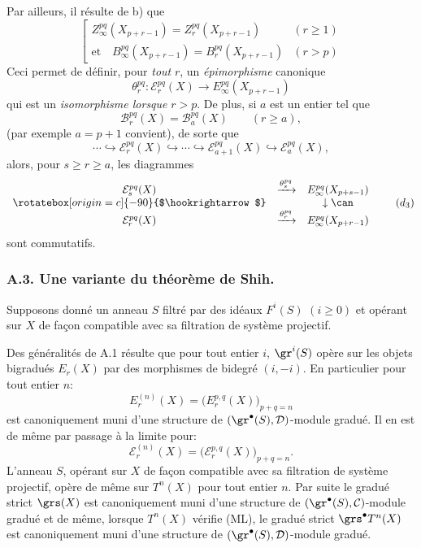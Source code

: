 Par ailleurs, il résulte de b) que
\begin{equation}
\left[
\begin{array}{ll}
Z_\infty^{pq}(X_{p+r-1})=Z_r^{pq}(X_{p+r-1})&(r\ge1)\\[3pt]
\text{et}\quad B_\infty^{pq}(X_{p+r-1})=B_r^{pq}(X_{p+r-1})&(r>p)
\end{array}
\right.
\tag{\(d_2\)}
\end{equation}
Ceci permet de définir, pour \emph{tout} \(r\), un \emph{épimorphisme} canonique
\[
\theta_r^{pq}:\mathcal{E}_r^{pq}(X)\longrightarrow E_\infty^{pq}(X_{p+r-1})
\]
qui est un \emph{isomorphisme lorsque} \(r>p\). De plus, si \(a\) est un entier tel que
\[
\mathcal{B}_r^{pq}(X)=\mathcal{B}_a^{pq}(X)\qquad(r\ge a),
\]
(par exemple \(a=p+1\) convient), de sorte que
\begin{equation}
\cdots\hookrightarrow\mathcal{E}_r^{pq}(X)\hookrightarrow\cdots\hookrightarrow
\mathcal{E}_{a+1}^{pq}(X)\hookrightarrow\mathcal{E}_a^{pq}(X),
\tag{S bis}
\end{equation}
alors, pour \(s\ge r\ge a\), les diagrammes
\begin{equation}
\begin{array}{ccc}
\mathcal{E}_s^{pq}(X)&\xrightarrow{\theta_s^{pq}}&E_\infty^{pq}(X_{p+s-1})\\
\rotatebox[origin=c]{-90}{$\hookrightarrow$}&&\downarrow\can\\
\mathcal{E}_r^{pq}(X)&\xrightarrow{\theta_r^{pq}}&E_\infty^{pq}(X_{p+r-1})
\end{array}
\tag{\(d_3\)}
\end{equation}
sont commutatifs.

\subsubsection*{A.3. Une variante du théorème de Shih.}
Supposons donné un anneau \(S\) filtré par des idéaux \(F^i(S)\) \((i\ge0)\) et opérant sur \(X\) de façon compatible avec sa filtration de système projectif.

Des généralités de A.1 résulte que pour tout entier \(i\), \(\gr^i(S)\) opère sur les objets bigradués \(E_r(X)\) par des morphismes de bidegré \((i,-i)\). En particulier pour tout entier \(n\):
\[
E_r^{(n)}(X)=\bigl(E_r^{p,q}(X)\bigr)_{p+q=n}
\]
est canoniquement muni d'une structure de \((\gr^\bullet(S),\mathcal{D})\)-module gradué. Il en est de même par passage à la limite pour:
\[
\mathcal{E}_r^{(n)}(X)=\bigl(\mathcal{E}_r^{p,q}(X)\bigr)_{p+q=n}.
\]
L'anneau \(S\), opérant sur \(X\) de façon compatible avec sa filtration de système projectif, opère de même sur \(T^n(X)\) pour tout entier \(n\). Par suite le gradué strict \(\grs(X)\) est
canoniquement muni d'une structure de \((\gr^\bullet(S),\mathcal{C})\)-module gradué et de même, lorsque \(T^n(X)\) vérifie (ML), le gradué strict \(\grs^\bullet T^n(X)\) est canoniquement muni d'une structure de \((\gr^\bullet(S),\mathcal{D})\)-module gradué.

